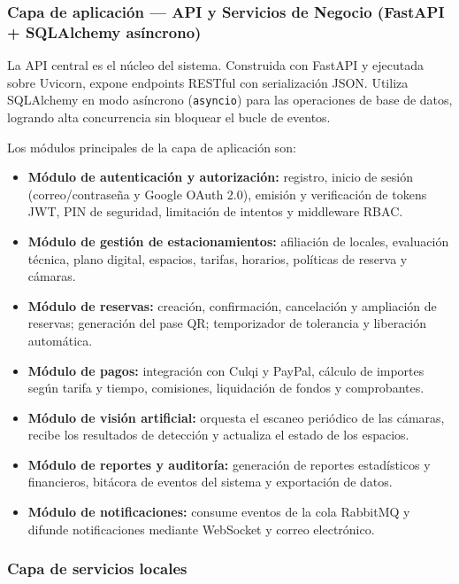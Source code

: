 \subsubsection{Capa de aplicación --- API y Servicios de Negocio (FastAPI + SQLAlchemy asíncrono)}

La API central es el núcleo del sistema. Construida con FastAPI y ejecutada sobre Uvicorn, expone endpoints RESTful con serialización JSON. Utiliza SQLAlchemy en modo asíncrono (\texttt{asyncio}) para las operaciones de base de datos, logrando alta concurrencia sin bloquear el bucle de eventos.

Los módulos principales de la capa de aplicación son:

\begin{itemize}
    \item \textbf{Módulo de autenticación y autorización:} registro, inicio de sesión (correo/contraseña y Google OAuth 2.0), emisión y verificación de tokens JWT, PIN de seguridad, limitación de intentos y middleware RBAC.
    \item \textbf{Módulo de gestión de estacionamientos:} afiliación de locales, evaluación técnica, plano digital, espacios, tarifas, horarios, políticas de reserva y cámaras.
    \item \textbf{Módulo de reservas:} creación, confirmación, cancelación y ampliación de reservas; generación del pase QR; temporizador de tolerancia y liberación automática.
    \item \textbf{Módulo de pagos:} integración con Culqi y PayPal, cálculo de importes según tarifa y tiempo, comisiones, liquidación de fondos y comprobantes.
    \item \textbf{Módulo de visión artificial:} orquesta el escaneo periódico de las cámaras, recibe los resultados de detección y actualiza el estado de los espacios.
    \item \textbf{Módulo de reportes y auditoría:} generación de reportes estadísticos y financieros, bitácora de eventos del sistema y exportación de datos.
    \item \textbf{Módulo de notificaciones:} consume eventos de la cola RabbitMQ y difunde notificaciones mediante WebSocket y correo electrónico.
\end{itemize}

\subsubsection{Capa de servicios locales}

